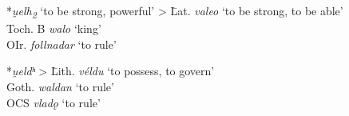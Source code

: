 \documentclass[output=paper,colorlinks,citecolor=brown]{langscibook}
\begin{document}
\ea\label{strong}
\begin{tabbing}
*\textit{u̯elh\textsubscript{2}} ‘to be strong, powerful’ >	\= Lat. \textit{valeo} ‘to be strong, to be able’ \\
\> Toch. B \textit{walo} ‘king’ \\
\> OIr. \textit{follnadar} ‘to rule’ 
\end{tabbing}

\begin{tabbing}    
*\textit{u̯eldʰ} >	\= Lith. \textit{véldu} ‘to possess, to govern’ \\
\> Goth. \textit{waldan} ‘to rule’ \\
\> OCS \textit{vladǫ} ‘to rule’
\end{tabbing}
 
\z
\end{document}

